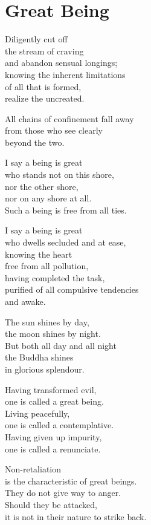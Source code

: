 
\chapter{Great Being}


Diligently cut off\\
the stream of craving\\
and abandon sensual longings;\\
knowing the inherent limitations\\
of all that is formed,\\
realize the uncreated.


All chains of confinement fall away\\
from those who see clearly\\
beyond the two.


I say a being is great\\
who stands not on this shore,\\
nor the other shore,\\
nor on any shore at all.\\
Such a being is free from all ties.


I say a being is great\\
who dwells secluded and at ease,\\
knowing the heart\\
free from all pollution,\\
having completed the task,\\
purified of all compulsive tendencies\\
and awake.


The sun shines by day,\\
the moon shines by night.\\
But both all day and all night\\
the Buddha shines\\
in glorious splendour.


Having transformed evil,\\
one is called a great being.\\
Living peacefully,\\
one is called a contemplative.\\
Having given up impurity,\\
one is called a renunciate.


Non-retaliation\\
is the characteristic of great beings.\\
They do not give way to anger.\\
Should they be attacked,\\
it is not in their nature to strike back.


